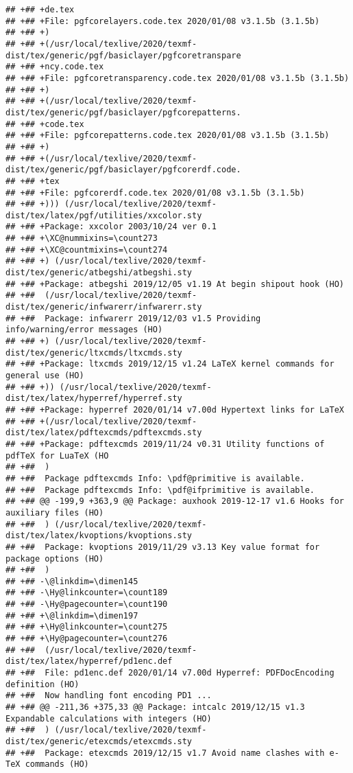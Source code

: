 \documentclass[ignorenonframetext,]{beamer}
\begin{document}
\begin{verbatim}
## +## +de.tex
## +## +File: pgfcorelayers.code.tex 2020/01/08 v3.1.5b (3.1.5b)
## +## +)
## +## +(/usr/local/texlive/2020/texmf-dist/tex/generic/pgf/basiclayer/pgfcoretranspare
## +## +ncy.code.tex
## +## +File: pgfcoretransparency.code.tex 2020/01/08 v3.1.5b (3.1.5b)
## +## +)
## +## +(/usr/local/texlive/2020/texmf-dist/tex/generic/pgf/basiclayer/pgfcorepatterns.
## +## +code.tex
## +## +File: pgfcorepatterns.code.tex 2020/01/08 v3.1.5b (3.1.5b)
## +## +)
## +## +(/usr/local/texlive/2020/texmf-dist/tex/generic/pgf/basiclayer/pgfcorerdf.code.
## +## +tex
## +## +File: pgfcorerdf.code.tex 2020/01/08 v3.1.5b (3.1.5b)
## +## +))) (/usr/local/texlive/2020/texmf-dist/tex/latex/pgf/utilities/xxcolor.sty
## +## +Package: xxcolor 2003/10/24 ver 0.1
## +## +\XC@nummixins=\count273
## +## +\XC@countmixins=\count274
## +## +) (/usr/local/texlive/2020/texmf-dist/tex/generic/atbegshi/atbegshi.sty
## +## +Package: atbegshi 2019/12/05 v1.19 At begin shipout hook (HO)
## +##  (/usr/local/texlive/2020/texmf-dist/tex/generic/infwarerr/infwarerr.sty
## +##  Package: infwarerr 2019/12/03 v1.5 Providing info/warning/error messages (HO)
## +## +) (/usr/local/texlive/2020/texmf-dist/tex/generic/ltxcmds/ltxcmds.sty
## +## +Package: ltxcmds 2019/12/15 v1.24 LaTeX kernel commands for general use (HO)
## +## +)) (/usr/local/texlive/2020/texmf-dist/tex/latex/hyperref/hyperref.sty
## +## +Package: hyperref 2020/01/14 v7.00d Hypertext links for LaTeX
## +## +(/usr/local/texlive/2020/texmf-dist/tex/latex/pdftexcmds/pdftexcmds.sty
## +## +Package: pdftexcmds 2019/11/24 v0.31 Utility functions of pdfTeX for LuaTeX (HO
## +##  )
## +##  Package pdftexcmds Info: \pdf@primitive is available.
## +##  Package pdftexcmds Info: \pdf@ifprimitive is available.
## +## @@ -199,9 +363,9 @@ Package: auxhook 2019-12-17 v1.6 Hooks for auxiliary files (HO)
## +##  ) (/usr/local/texlive/2020/texmf-dist/tex/latex/kvoptions/kvoptions.sty
## +##  Package: kvoptions 2019/11/29 v3.13 Key value format for package options (HO)
## +##  )
## +## -\@linkdim=\dimen145
## +## -\Hy@linkcounter=\count189
## +## -\Hy@pagecounter=\count190
## +## +\@linkdim=\dimen197
## +## +\Hy@linkcounter=\count275
## +## +\Hy@pagecounter=\count276
## +##  (/usr/local/texlive/2020/texmf-dist/tex/latex/hyperref/pd1enc.def
## +##  File: pd1enc.def 2020/01/14 v7.00d Hyperref: PDFDocEncoding definition (HO)
## +##  Now handling font encoding PD1 ...
## +## @@ -211,36 +375,33 @@ Package: intcalc 2019/12/15 v1.3 Expandable calculations with integers (HO)
## +##  ) (/usr/local/texlive/2020/texmf-dist/tex/generic/etexcmds/etexcmds.sty
## +##  Package: etexcmds 2019/12/15 v1.7 Avoid name clashes with e-TeX commands (HO)

\end{verbatim}
\end{document}
